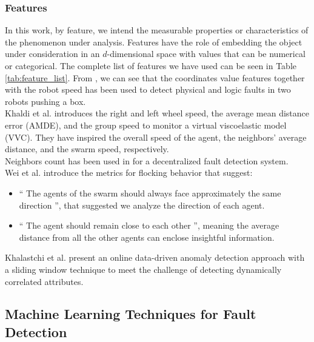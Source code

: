 \documentclass[../../Thesis.tex]{subfiles}
\begin{document}
		\subsubsection{Features} 
	 		In this work, by feature, we intend the measurable properties or characteristics of the phenomenon under analysis. Features have the role of embedding the object under consideration in an $d$-dimensional space with values that can be numerical or categorical. The complete list of features we have used can be seen in Table \ref{tab:feature_list}. 
	 		From \cite{LiXingyan2007}, we can see that the coordinates value features together with the robot speed has been used to detect physical and logic faults in two robots pushing a box.\\
	 		Khaldi et al.  \cite{Khaldi2017} introduces the right and left wheel speed, the average mean distance error (AMDE), and the group speed to monitor a virtual viscoelastic model (VVC). They have inspired the overall speed of the agent, the neighbors' average distance, and the swarm speed, respectively.\\
	 		Neighbors count has been used in \cite{Tarapore2017} for a decentralized fault detection system.\\
	 		Wei et al. \cite{Wei2017} introduce the metrics for flocking behavior that suggest:
	 		\begin{itemize}
	 			\item “ The agents of the swarm should always face approximately the same direction ”, that suggested we analyze the direction of each agent.
	 			\item “ The agent should remain close to each other ”, meaning the average distance from all the other agents can enclose insightful information.
	 		\end{itemize}
	 		Khalastchi et al. \cite{Khalastchi2015} present an online data-driven anomaly detection approach with a sliding window technique to meet the challenge of detecting dynamically correlated attributes. \\	 		
	 		
	 \subsection{Machine Learning Techniques for Fault Detection}
	 	
\end{document}
